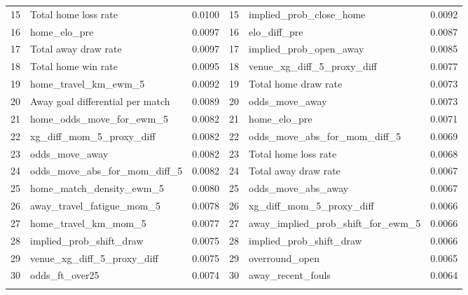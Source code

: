 \documentclass[pdflatex,sn-mathphys-num]{sn-jnl}
\theoremstyle{thmstyleone}
\theoremstyle{thmstyletwo}
\theoremstyle{thmstylethree}
\begin{document}
\begin{table}[h]
\begin{tabular*}{\textwidth}{@{\extracolsep\fill}rlc|rlc@{}}
15 & Total home loss rate               & 0.0100 & 15 & implied\_prob\_close\_home              & 0.0092 \\
16 & home\_elo\_pre                     & 0.0097 & 16 & elo\_diff\_pre                          & 0.0087 \\
17 & Total away draw rate               & 0.0097 & 17 & implied\_prob\_open\_away               & 0.0085 \\
18 & Total home win rate                & 0.0095 & 18 & venue\_xg\_diff\_5\_proxy\_diff         & 0.0077 \\
19 & home\_travel\_km\_ewm\_5            & 0.0092 & 19 & Total home draw rate                    & 0.0073 \\
20 & Away goal differential per match   & 0.0089 & 20 & odds\_move\_away                        & 0.0073 \\
21 & home\_odds\_move\_for\_ewm\_5        & 0.0082 & 21 & home\_elo\_pre                          & 0.0071 \\
22 & xg\_diff\_mom\_5\_proxy\_diff       & 0.0082 & 22 & odds\_move\_abs\_for\_mom\_diff\_5       & 0.0069 \\
23 & odds\_move\_away                   & 0.0082 & 23 & Total home loss rate                    & 0.0068 \\
24 & odds\_move\_abs\_for\_mom\_diff\_5   & 0.0082 & 24 & Total away draw rate                    & 0.0067 \\
25 & home\_match\_density\_ewm\_5        & 0.0080 & 25 & odds\_move\_abs\_away                   & 0.0067 \\
26 & away\_travel\_fatigue\_mom\_5       & 0.0078 & 26 & xg\_diff\_mom\_5\_proxy\_diff           & 0.0066 \\
27 & home\_travel\_km\_mom\_5            & 0.0077 & 27 & away\_implied\_prob\_shift\_for\_ewm\_5  & 0.0066 \\
28 & implied\_prob\_shift\_draw           & 0.0075 & 28 & implied\_prob\_shift\_draw              & 0.0066 \\
29 & venue\_xg\_diff\_5\_proxy\_diff     & 0.0075 & 29 & overround\_open                         & 0.0065 \\
30 & odds\_ft\_over25                   & 0.0074 & 30 & away\_recent\_fouls                     & 0.0064 \\
\botrule
\end{tabular*}
\end{table}
\end{document}
